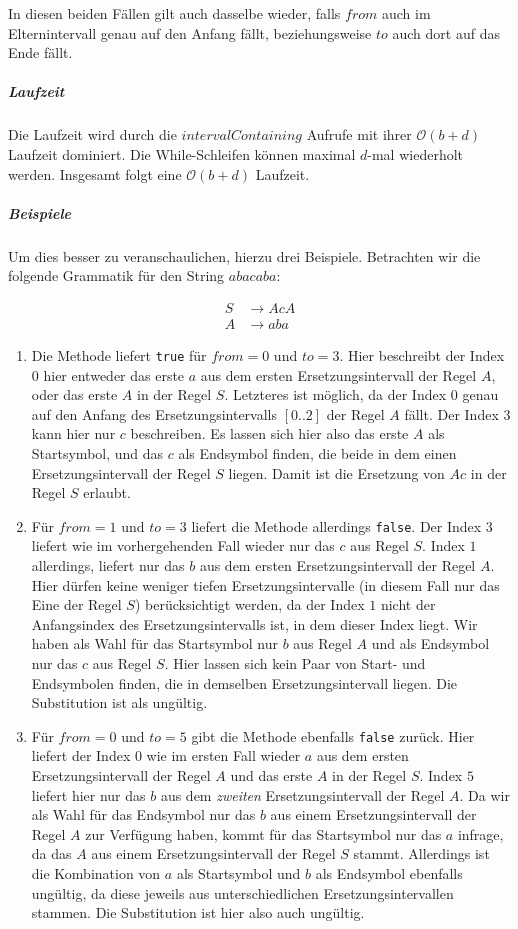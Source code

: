 In diesen beiden Fällen gilt auch dasselbe wieder, falls $from$ auch im Elternintervall genau auf den Anfang fällt, beziehungsweise $to$ auch dort auf das Ende fällt.

\subparagraph{Laufzeit} 
Die Laufzeit wird durch die $intervalContaining$ Aufrufe mit ihrer $\mathcal{O}(b + d)$ Laufzeit dominiert. Die While-Schleifen können maximal $d$-mal wiederholt werden. Insgesamt folgt eine $\mathcal{O}(b + d)$ Laufzeit. 

\subparagraph{Beispiele}
Um dies besser zu veranschaulichen, hierzu drei Beispiele. Betrachten wir die folgende Grammatik für den String $abacaba$:

\begin{align*}
    S &\rightarrow AcA\\
    A &\rightarrow aba
\end{align*}
\begin{enumerate}
    \item Die Methode liefert \texttt{true} für $from=0$ und $to=3$. Hier beschreibt der Index $0$ hier entweder das erste $a$ aus dem ersten Ersetzungsintervall der Regel $A$, oder das erste $A$ in der Regel $S$. Letzteres ist möglich, da der Index $0$ genau auf den Anfang des Ersetzungsintervalls $[0..2]$ der Regel $A$ fällt. Der Index $3$ kann hier nur $c$ beschreiben.
    Es lassen sich hier also das erste $A$ als Startsymbol, und das $c$ als Endsymbol finden, die beide in dem einen Ersetzungsintervall der Regel $S$ liegen. Damit ist die Ersetzung von $Ac$ in der Regel $S$ erlaubt.
    \item Für $from=1$ und $to=3$ liefert die Methode allerdings \texttt{false}. Der Index $3$ liefert wie im vorhergehenden Fall wieder nur das $c$ aus Regel $S$.
    Index $1$ allerdings, liefert nur das $b$ aus dem ersten Ersetzungsintervall der Regel $A$. Hier dürfen keine weniger tiefen Ersetzungsintervalle (in diesem Fall nur das Eine der Regel $S$) berücksichtigt werden, da der Index $1$ nicht der Anfangsindex des Ersetzungsintervalls ist, in dem dieser Index liegt.
    Wir haben als Wahl für das Startsymbol nur $b$ aus Regel $A$ und als Endsymbol nur das $c$ aus Regel $S$. Hier lassen sich kein Paar von Start- und Endsymbolen finden, die in demselben Ersetzungsintervall liegen. Die Substitution ist als ungültig.
    \item Für $from=0$ und $to=5$ gibt die Methode ebenfalls \texttt{false} zurück. Hier liefert der Index $0$ wie im ersten Fall wieder $a$ aus dem ersten Ersetzungsintervall der Regel $A$ und das erste $A$ in der Regel $S$. Index $5$ liefert hier nur das $b$ aus dem \emph{zweiten} Ersetzungsintervall der Regel $A$. 
    Da wir als Wahl für das Endsymbol nur das $b$ aus einem Ersetzungsintervall der Regel $A$ zur Verfügung haben, kommt für das Startsymbol nur das $a$ infrage, da das $A$ aus einem Ersetzungsintervall der Regel $S$ stammt.
    Allerdings ist die Kombination von $a$ als Startsymbol und $b$ als Endsymbol ebenfalls ungültig, da diese jeweils aus unterschiedlichen Ersetzungsintervallen stammen.
    Die Substitution ist hier also auch ungültig.
\end{enumerate}

